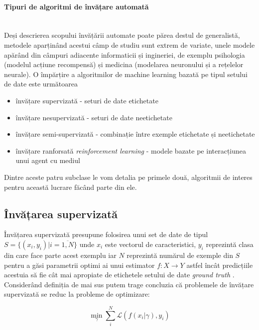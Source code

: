 \paragraph{Tipuri de algoritmi de învățare automată} \mbox{} \\

Deși descrierea scopului învățării automate poate părea destul de generalistă, metodele aparținând acestui câmp de studiu sunt extrem de variate, unele modele apărând din câmpuri adiacente informaticii și ingineriei, de exemplu psihologia (modelul acțiune recompensă) și medicina (modelarea neuronului și a rețelelor neurale). O împărțire a algoritmilor de machine learning bazată pe tipul setului de date este următoarea

\begin{itemize}
\item învățare supervizată - seturi de date etichetate
\item învățare nesupervizată - seturi de date neetichetate
\item învățare semi-supervizată - combinație între exemple etichetate și neetichetate
\item învățare ranforsată \textit{reinforcement learning} - modele bazate pe interacțiunea unui agent cu mediul
\end{itemize}

Dintre aceste patru subclase le vom detalia pe primele două, algoritmii de interes pentru această lucrare făcând parte din ele.

\subsection{Învățarea supervizată}
Învățarea supervizată presupune folosirea unui set de date de tipul $S = \{(x_i, y_i) | i = \overline{1, N}\}$ unde $x_i$ este vectorul de caracteristici, $y_i$ reprezintă clasa din care face parte acest exemplu iar $N$ reprezintă numărul de exemple din $S$ pentru a  găsi parametrii optimi ai unui estimator $f : X \rightarrow Y$  astfel încât predicțiile acestuia să fie cât mai apropiate de etichetele setului de date \textit{ground truth} \cite{AIBook}. Considerând definiția de mai sus putem trage concluzia că problemele de învățare supervizată se reduc la probleme de optimizare:

\begin{equation}
\min_{\gamma} \sum_{i}^{N} \mathcal{L}(f(x_i | \gamma), y_i)  
\end{equation} 


